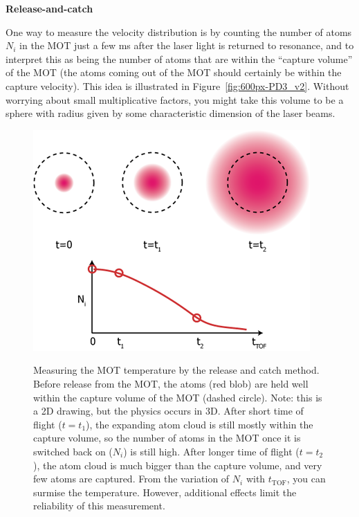\documentclass{../lab}
\begin{document}
\textbf{Release-and-catch}

One way to measure the velocity distribution is by counting the number of atoms $N_i$ in the MOT just a few ms after the laser light is returned to resonance, and to interpret this as being the number of atoms that are within the ``capture volume'' of the MOT (the atoms coming out of the MOT should certainly be within the capture velocity). This idea is illustrated in Figure~\ref{fig:600px-PD3_v2}. Without worrying about small multiplicative factors, you might take this volume to be a sphere with radius given by some characteristic dimension of the laser beams.

\begin{figure}[h]
    \centering
    \href{http://experimentationlab.berkeley.edu/sites/default/files/images/400px-Release_catch.png}{\includegraphics[width=0.5\linewidth]{images/400px-Release_catch.png}}
    \caption{Measuring the MOT temperature by the release and catch method. Before release from the MOT, the atoms (red blob) are held well within the capture volume of the MOT (dashed circle). Note: this is a 2D drawing, but the physics occurs in 3D. After short time of flight ($t = t_1$), the expanding atom cloud is still mostly within the capture volume, so the number of atoms in the MOT once it is switched back on ($N_i$) is still high. After longer time of flight ($t = t_2$), the atom cloud is much bigger than the capture volume, and very few atoms are captured. From the variation of $N_i$ with $t_\text{TOF}$, you can surmise the temperature. However, additional effects limit the reliability of this measurement.}
    \label{fig:400px-Release_catch}
\end{figure}
\end{document}
